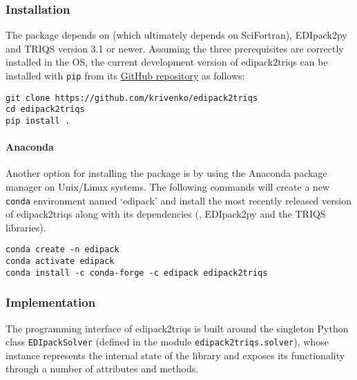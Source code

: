 \documentclass[edipack2.tex]{subfiles}
\begin{document}
\subsubsection{Installation}\label{sSecInteropTRIQSInstallation}
The package depends on \NAME (which ultimately depends on SciFortran), EDIpack2py
and TRIQS version 3.1 or newer. Assuming the three prerequisites are correctly 
installed in the OS, the current development version of edipack2triqs can be 
installed with {\tt pip} from its 
\href{https://github.com/krivenko/edipack2triqs}{GitHub repository} as follows:

\begin{lstlisting}[style=mybash]
git clone https://github.com/krivenko/edipack2triqs
cd edipack2triqs
pip install .
\end{lstlisting}

\paragraph{Anaconda}
Another option for installing the package is by using the Anaconda package 
manager on Unix/Linux systems.
The following commands will create a new {\tt conda} environment named 
`edipack' and install the most recently released version of edipack2triqs along 
with its dependencies (\NAME, EDIpack2py and the TRIQS libraries).

\begin{lstlisting}[style=mybash]
conda create -n edipack
conda activate edipack
conda install -c conda-forge -c edipack edipack2triqs
\end{lstlisting}

\subsubsection{Implementation}\label{sSecInteropTRIQSImplementation}
The programming interface of edipack2triqs is built around the singleton 
Python class {\tt EDIpackSolver} (defined in the module
{\tt edipack2triqs.solver}), whose instance represents the internal state of 
the \NAME library and exposes its functionality through a number of 
attributes and methods.
\end{document}
